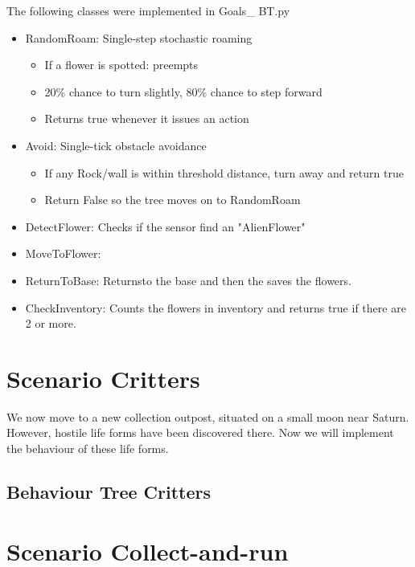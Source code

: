 \documentclass[11pt]{article}
\begin{document}
The following classes were implemented in Goals\_ BT.py
\begin{itemize}
\item RandomRoam: Single-step stochastic roaming
\begin{itemize}
\item If a flower is spotted: preempts
\item 20\% chance to turn slightly, 80\% chance to step forward
\item Returns true whenever it issues an action
\end{itemize}
\item Avoid: Single-tick obstacle avoidance
\begin{itemize}
\item If any Rock/wall is within threshold distance, turn away and return true
\item Return False so the tree moves on to RandomRoam
\end{itemize}
\item DetectFlower: Checks if the sensor find an "AlienFlower"
\item MoveToFlower:
\item ReturnToBase: Returnsto the base and then the saves the flowers.
\item CheckInventory: Counts the flowers in inventory and returns true if there are 2 or more.
\end{itemize}
\section{Scenario Critters}
\label{sec:org6dfd90e}
We now move to a new collection outpost, situated on a small moon near Saturn. However, hostile life forms have been discovered there. Now we will implement the behaviour of these life forms.
\subsection{Behaviour Tree Critters}
\label{sec:org9dda7be}
\section{Scenario Collect-and-run}
\label{sec:org3071b71}
\end{document}
